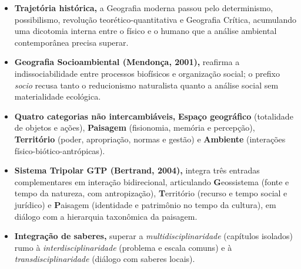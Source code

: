 \begin{boxResumo}
\begin{itemize}[leftmargin=1.5em, itemsep=2.5pt]
  \item \textbf{Trajetória histórica,} a Geografia moderna passou pelo determinismo, possibilismo, revolução teorético-quantitativa e Geografia Crítica, acumulando uma dicotomia interna entre o físico e o humano que a análise ambiental contemporânea precisa superar.
  \item \textbf{Geografia Socioambiental (Mendonça, 2001),} reafirma a indissociabilidade entre processos biofísicos e organização social; o prefixo \textit{socio} recusa tanto o reducionismo naturalista quanto a análise social sem materialidade ecológica.
  \item \textbf{Quatro categorias não intercambiáveis,} \textbf{Espaço geográfico} (totalidade de objetos e ações), \textbf{Paisagem} (fisionomia, memória e percepção), \textbf{Território} (poder, apropriação, normas e gestão) e \textbf{Ambiente} (interações físico-biótico-antrópicas).
  \item \textbf{Sistema Tripolar GTP (Bertrand, 2004),} integra três entradas complementares em interação bidirecional, articulando \textbf{G}eossistema (fonte e tempo da natureza, com antropização), \textbf{T}erritório (recurso e tempo social e jurídico) e \textbf{P}aisagem (identidade e patrimônio no tempo da cultura), em diálogo com a hierarquia taxonômica da paisagem.
  \item \textbf{Integração de saberes,} superar a \textit{multidisciplinaridade} (capítulos isolados) rumo à \textit{interdisciplinaridade} (problema e escala comuns) e à \textit{transdisciplinaridade} (diálogo com saberes locais).
\end{itemize}
\end{boxResumo}

